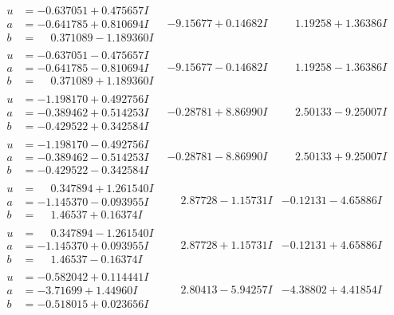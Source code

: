 \documentclass[1p]{elsarticle_modified}
\theoremstyle{definition}
\begin{document}
$$\begin{array}{c|c|c}
\begin{aligned}
u &= -0.637051 + 0.475657 I \\
a &= -0.641785 + 0.810694 I \\
b &= \phantom{-}0.371089 - 1.189360 I\end{aligned}
 & -9.15677 + 0.14682 I & \phantom{-}1.19258 + 1.36386 I \\ \hline\begin{aligned}
u &= -0.637051 - 0.475657 I \\
a &= -0.641785 - 0.810694 I \\
b &= \phantom{-}0.371089 + 1.189360 I\end{aligned}
 & -9.15677 - 0.14682 I & \phantom{-}1.19258 - 1.36386 I \\ \hline\begin{aligned}
u &= -1.198170 + 0.492756 I \\
a &= -0.389462 + 0.514253 I \\
b &= -0.429522 + 0.342584 I\end{aligned}
 & -0.28781 + 8.86990 I & \phantom{-}2.50133 - 9.25007 I \\ \hline\begin{aligned}
u &= -1.198170 - 0.492756 I \\
a &= -0.389462 - 0.514253 I \\
b &= -0.429522 - 0.342584 I\end{aligned}
 & -0.28781 - 8.86990 I & \phantom{-}2.50133 + 9.25007 I \\ \hline\begin{aligned}
u &= \phantom{-}0.347894 + 1.261540 I \\
a &= -1.145370 - 0.093955 I \\
b &= \phantom{-}1.46537 + 0.16374 I\end{aligned}
 & \phantom{-}2.87728 - 1.15731 I & -0.12131 - 4.65886 I \\ \hline\begin{aligned}
u &= \phantom{-}0.347894 - 1.261540 I \\
a &= -1.145370 + 0.093955 I \\
b &= \phantom{-}1.46537 - 0.16374 I\end{aligned}
 & \phantom{-}2.87728 + 1.15731 I & -0.12131 + 4.65886 I \\ \hline\begin{aligned}
u &= -0.582042 + 0.114441 I \\
a &= -3.71699 + 1.44960 I \\
b &= -0.518015 + 0.023656 I\end{aligned}
 & \phantom{-}2.80413 - 5.94257 I & -4.38802 + 4.41854 I \\ \hline\begin{aligned}

\end{aligned}
\end{array}$$
\end{document}
